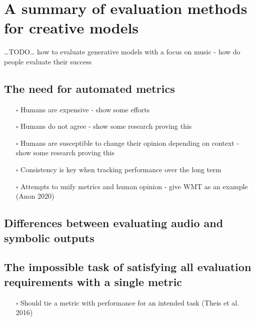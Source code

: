 \documentclass[12pt,a4paper,]{report}
\providecommand{\tightlist}{%
  \setlength{\itemsep}{0pt}\setlength{\parskip}{0pt}}
\begin{document}
\hypertarget{a-summary-of-evaluation-methods-for-creative-models}{%
\section{A summary of evaluation methods for creative
models}\label{a-summary-of-evaluation-methods-for-creative-models}}

\ldots TODO\ldots{} how to evaluate generative models with a focus on
music - how do people evaluate their success

\hypertarget{the-need-for-automated-metrics}{%
\subsection{The need for automated
metrics}\label{the-need-for-automated-metrics}}

\begin{itemize}
\tightlist
\item[$\square$]
  Humans are expensive - show some efforts
\item[$\square$]
  Humans do not agree - show some research proving this
\item[$\square$]
  Humans are susceptible to change their opinion depending on context -
  show some research proving this
\item[$\square$]
  Consistency is key when tracking performance over the long term
\item[$\square$]
  Attempts to unify metrics and human opinion - give WMT as an example
  (Anon 2020)
\end{itemize}

\hypertarget{differences-between-evaluating-audio-and-symbolic-outputs}{%
\subsection{Differences between evaluating audio and symbolic
outputs}\label{differences-between-evaluating-audio-and-symbolic-outputs}}

\hypertarget{the-impossible-task-of-satisfying-all-evaluation-requirements-with-a-single-metric}{%
\subsection{The impossible task of satisfying all evaluation
requirements with a single
metric}\label{the-impossible-task-of-satisfying-all-evaluation-requirements-with-a-single-metric}}

\begin{itemize}
\tightlist
\item[$\square$]
  Should tie a metric with performance for an intended task (Theis et
  al. 2016)
\end{itemize}
\end{document}
